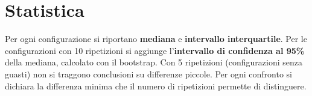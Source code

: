 \section{Statistica}

Per ogni configurazione si riportano \textbf{mediana} e \textbf{intervallo interquartile}. Per le configurazioni con 10 ripetizioni si aggiunge l'\textbf{intervallo di confidenza al 95\%} della mediana, calcolato con il bootstrap. Con 5 ripetizioni (configurazioni senza guasti) non si traggono conclusioni su differenze piccole. Per ogni confronto si dichiara la differenza minima che il numero di ripetizioni permette di distinguere.
